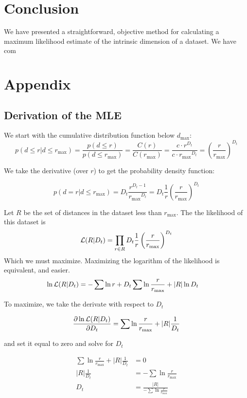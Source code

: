 \documentclass[11pt]{article}
\begin{document}
\section{Conclusion}

We have presented a straightforward, objective method for calculating a maximum likelihood estimate of the intrinsic dimension of a dataset. We have com 

\section{Appendix}

\subsection{Derivation of the MLE}

We start with the cumulative distribution function below $d_{\max}$:
\[
p(d \leq r | d \leq r_{\max}) = \frac{p(d \leq r)}{p(d \leq r_{\max})} = \frac{C(r)}{C(r_{\max})} = \frac{c \cdot r^{D_t}}{c \cdot {r_{\max}} ^ {D_t}} = \left ( \frac{r}{r_{\max}} \right )^{D_t}
\]

We take the derivative (over $r$) to get the probability density function:

\[
p(d = r | d \leq r_{\max}) = D_t \frac{r^{D_t-1}}{{r_{\max}}^{D_t}} = D_t \frac{1}{r} \left (\frac{r}{r_{\max}} \right ) ^ {D_t} 
\]

Let $R$ be the set of distances in the dataset less than $r_{\max}$. The the likelihood of this dataset is
\[
{\cal L}(R|D_t) = \prod_{r \in R} D_t \frac{1}{r} \left (\frac{r}{r_{\max}} \right ) ^ {D_t} 
\] 
Which we must maximize. Maximizing the logarithm of the likelihood is equivalent, and easier.
\begin{align*}
\ln {\cal L}(R|D_t) &= -\sum \ln r + D_t \sum \ln \frac{r}{r_{\max}} + |R| \ln D_t
\end{align*}

To maximize, we take the derivate with respect to $D_t$

\begin{align*}
\frac{\partial \ln{\cal L}(R|D_t)}{\partial D_t} = \sum{\ln \frac{r}{r_{\max}}} + |R|\frac{1}{D_t}
\end{align*}

and set it equal to zero and solve for $D_t$

\begin{align*}
\sum{\ln \frac{r}{r_{\max}}} + |R|\frac{1}{D_t} &= 0 \\
|R|\frac{1}{D_t} &= - \sum{\ln \frac{r}{r_{\max}}} \\
D_t &= \frac{|R|}{- \sum{\ln \frac{r}{r_{\max}}}} 
\end{align*}
\end{document}
